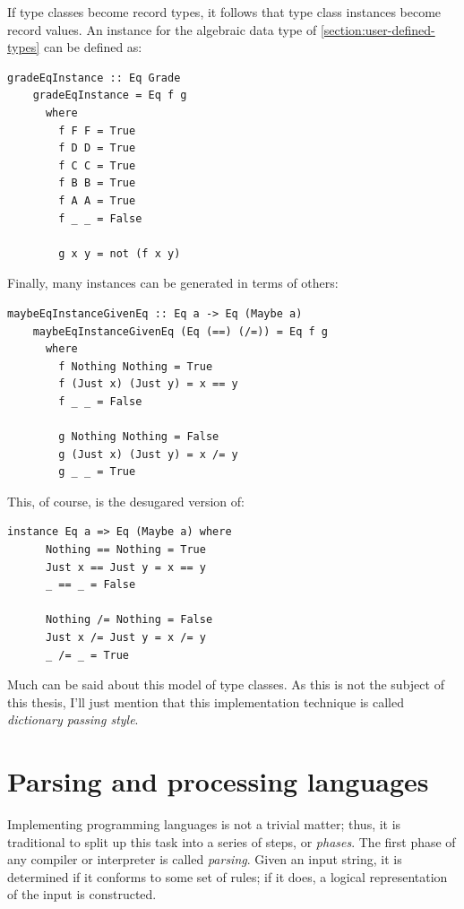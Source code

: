 \documentclass[UdineBachThesis,american,11pt]{PhdThesis}
\begin{document}
  If type classes become record types, it follows that type class instances
  become record values. An \lstinline@Eq@ instance for the algebraic data type
  \lstinline@Grade@ of \autoref{section:user-defined-types} can be defined as:

  \begin{lstlisting}[gobble=4,basicstyle=\ttfamily\small]
    gradeEqInstance :: Eq Grade
    gradeEqInstance = Eq f g
      where
        f F F = True
        f D D = True
        f C C = True
        f B B = True
        f A A = True
        f _ _ = False

        g x y = not (f x y)
  \end{lstlisting}

  Finally, many instances can be generated in terms of others:

  \begin{lstlisting}[gobble=4,basicstyle=\ttfamily\small]
    maybeEqInstanceGivenEq :: Eq a -> Eq (Maybe a)
    maybeEqInstanceGivenEq (Eq (==) (/=)) = Eq f g
      where
        f Nothing Nothing = True
        f (Just x) (Just y) = x == y
        f _ _ = False

        g Nothing Nothing = False
        g (Just x) (Just y) = x /= y
        g _ _ = True
  \end{lstlisting}

  This, of course, is the desugared version of:

  \begin{lstlisting}[gobble=4,basicstyle=\ttfamily\small]
    instance Eq a => Eq (Maybe a) where
      Nothing == Nothing = True
      Just x == Just y = x == y
      _ == _ = False

      Nothing /= Nothing = False
      Just x /= Just y = x /= y
      _ /= _ = True
  \end{lstlisting}

  Much can be said about this model of type classes. As this is not the subject
  of this thesis, I'll just mention that this implementation technique is called
  \emph{dictionary passing style}.

  \chapter{Parsing and processing languages}

  Implementing programming languages is not a trivial matter; thus, it is
  traditional to split up this task into a series of steps, or \emph{phases}.
  The first phase of any compiler or interpreter is called \emph{parsing}. Given
  an input string, it is determined if it conforms to some set of rules; if it
  does, a logical representation of the input is constructed.
\end{document}
